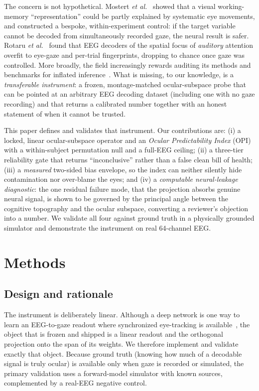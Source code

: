 \documentclass[conference]{IEEEtran}
\begin{document}
The concern is not hypothetical. Mostert \emph{et al.}~\cite{mostert2018eye} showed that a
visual working-memory ``representation'' could be partly explained by systematic eye movements,
and constructed a bespoke, within-experiment control: if the target variable cannot be decoded
from simultaneously recorded gaze, the neural result is safer. Rotaru
\emph{et al.}~\cite{rotaru2024decoding} found that EEG decoders of the spatial focus of
\emph{auditory} attention overfit to eye-gaze and per-trial fingerprints, dropping to chance
once gaze was controlled. More broadly, the field increasingly rewards auditing its methods and benchmarks for inflated
inference~\cite{eklund2016cluster,kapoor2023leakage,brookshire2024leakage,chaibubneto2018permutations}. What is missing, to our knowledge, is a \emph{transferable
instrument}: a frozen, montage-matched ocular-subspace probe that can be pointed at an
arbitrary EEG decoding dataset (including one with no gaze recording) and that returns a
calibrated number together with an honest statement of when it cannot be trusted.

This paper defines and validates that instrument. Our contributions are: (i) a locked,
linear ocular-subspace operator and an \emph{Ocular Predictability Index} (OPI) with a
within-subject permutation null and a full-EEG ceiling; (ii) a three-tier reliability gate
that returns ``inconclusive'' rather than a false clean bill of health; (iii) a \emph{measured}
two-sided bias envelope, so the index can neither silently hide contamination nor over-blame
the eyes; and (iv) a \emph{computable neural-leakage diagnostic}: the one residual failure mode,
that the projection absorbs genuine neural signal, is shown to be governed by the principal
angle between the cognitive topography and the ocular subspace, converting a reviewer's
objection into a number. We validate all four against ground truth in a physically grounded
simulator and demonstrate the instrument on real 64-channel EEG.

\section{Methods}

\subsection{Design and rationale}

The instrument is deliberately linear. Although a deep network is one way to learn an
EEG-to-gaze readout where synchronized eye-tracking is
available~\cite{kastrati2021eegeyenet,hollenstein2018zuco}, the object that is frozen and
shipped is a linear readout and the orthogonal projection onto the span of its weights. We
therefore implement and validate exactly that object. Because ground truth (knowing how much
of a decodable signal is truly ocular) is available only when gaze is recorded or simulated,
the primary validation uses a forward-model simulator with known sources, complemented by a
real-EEG negative control.
\end{document}
